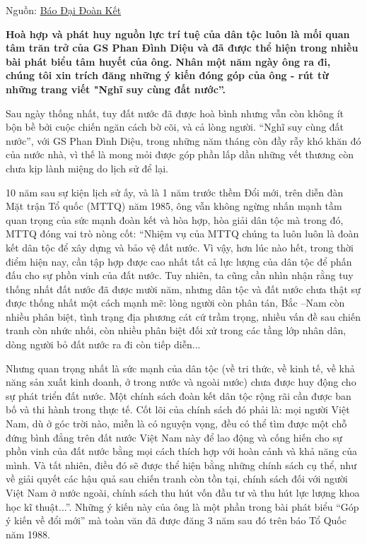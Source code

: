 Nguồn: \href{http://daidoanket.vn/giao-su-phan-dinh-dieu-nha-khoa-hoc-luon-tran-tro-voi-su-nghiep-dai-doan-ket-toan-dan-toc-435683.html}{Báo Đại Đoàn Kết}

\textbf{Hoà hợp và phát huy nguồn lực trí tuệ của dân tộc luôn là mối quan tâm trăn trở của GS Phan Đình Diệu và đã được thể hiện trong nhiều bài phát biểu tâm huyết của ông. Nhân một năm ngày ông ra đi, chúng tôi xin trích đăng những ý kiến đóng góp của ông - rút từ những trang viết "Nghĩ suy cùng đất nước”.}

Sau ngày thống nhất, tuy đất nước đã được hoà bình nhưng vẫn còn không ít bộn bề bởi cuộc chiến ngăn cách bờ cõi, và cả lòng người. “Nghĩ suy cùng đất nước”, với GS Phan Đình Diệu, trong những năm tháng còn đầy rẫy khó khăn đó của nước nhà, vì thế là mong mỏi được góp phần lấp dần những vết thương còn chưa kịp lành miệng do lịch sử để lại.

10 năm sau sự kiện lịch sử ấy, và là 1 năm trước thềm Đổi mới, trên diễn đàn Mặt trận Tổ quốc (MTTQ) năm 1985, ông vẫn không ngừng nhấn mạnh tầm quan trọng của sức mạnh đoàn kết và hòa hợp, hòa giải dân tộc mà trong đó, MTTQ đóng vai trò nòng cốt: “Nhiệm vụ của MTTQ chúng ta luôn luôn là đoàn kết dân tộc để xây dựng và bảo vệ đất nước. Vì vậy, hơn lúc nào hết, trong thời điểm hiện nay, cần tập hợp được cao nhất tất cả lực lượng của dân tộc để phấn đấu cho sự phồn vinh của đất nước. Tuy nhiên, ta cũng cần nhìn nhận rằng tuy thống nhất đất nước đã được mười năm, nhưng dân tộc và đất nước chưa thật sự được thống nhất một cách mạnh mẽ: lòng người còn phân tán, Bắc –Nam còn nhiều phân biệt, tình trạng địa phương cát cứ trầm trọng, nhiều vấn đề sau chiến tranh còn nhức nhối, còn nhiều phân biệt đối xử trong các tầng lớp nhân dân, dòng người bỏ đất nước ra đi còn tiếp diễn...

Nhưng quan trọng nhất là sức mạnh của dân tộc (về tri thức, về kinh tế, về khả năng sản xuất kinh doanh, ở trong nước và ngoài nước) chưa được huy động cho sự phát triển đất nước. Một chính sách đoàn kết dân tộc rộng rãi cần được ban bố và thi hành trong thực tế. Cốt lõi của chính sách đó phải là: mọi người Việt Nam, dù ở góc trời nào, miễn là có nguyện vọng, đều có thể tìm được một chỗ đứng bình đẳng trên đất nước Việt Nam này để lao động và cống hiến cho sự phồn vinh của đất nước bằng mọi cách thích hợp với hoàn cảnh và khả năng của mình. Và tất nhiên, điều đó sẽ được thể hiện bằng những chính sách cụ thể, như về giải quyết các hậu quả sau chiến tranh còn tồn tại, chính sách đối với người Việt Nam ở nước ngoài, chính sách thu hút vốn đầu tư và thu hút lực lượng khoa học kĩ thuật...”. Những ý kiến này của ông là một phần trong bài phát biểu “Góp ý kiến về đổi mới” mà toàn văn đã được đăng 3 năm sau đó trên báo Tổ Quốc năm 1988.

